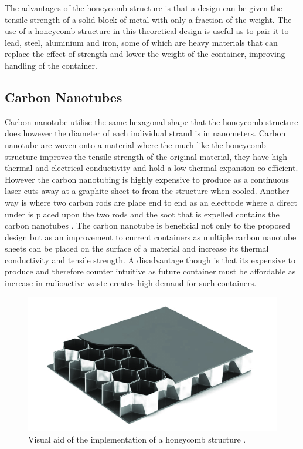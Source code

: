 The advantages of the honeycomb structure is that a design can be given the tensile strength of a solid block of metal with only a fraction of the weight. The use of a honeycomb structure in this theoretical design is useful as to pair it to lead, steel, aluminium and iron, some of which are heavy materials that can replace the effect of strength and lower the weight of the container, improving handling of the container. 

\subsection*{Carbon Nanotubes}
\label{Nano Tubes SubSection}

Carbon nanotube utilise the same hexagonal shape that the honeycomb structure does however the diameter of each individual strand is in nanometers. Carbon nanotube are woven onto a material where the much like the honeycomb structure improves the tensile strength of the original material, they have high thermal and electrical conductivity and hold a low thermal expansion co-efficient. However the carbon nanotubing is highly expensive to produce as a continuous laser cuts away at a graphite sheet to from the structure when cooled. Another way is where two carbon rods are place end to end as an electtode where a direct under is placed upon the two rods and the soot that is expelled contains the carbon nanotubes \cite{CarbonNano}. The carbon nanotube is beneficial not only to the proposed design but as an improvement to current containers as multiple carbon nanotube sheets can be placed on the surface of a material and increase its thermal conductivity and tensile strength. A disadvantage though is that its expensive to produce and therefore counter intuitive as future container must be affordable as increase in radioactive waste creates high demand for such containers.

\begin{figure}[H]
\centering
\includegraphics[scale=0.6]{Media/MaterialsResearch/Honeycomb-structure-Honeycomb-structures-are-highly-laborious-in-manufacturing-and.png}
\caption{Visual aid of the implementation of a honeycomb structure \cite{HoneycombPic}.}
\label{Honeycomb Image}
\end{figure}

